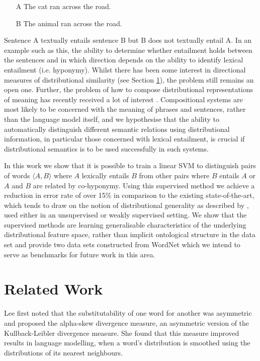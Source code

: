 \documentclass[11pt]{article}
\begin{document}
\begin{itemize}
\item[A]{The cat ran across the road.}
\item[B]{The animal ran across the road.}
\end{itemize}

Sentence A textually entails sentence B but B does not textually entail A. In an example such as this, the ability to determine whether entailment holds between the sentences and in which direction depends on the ability to identify lexical entailment (i.e. hyponymy). Whilst there has been some interest in directional measures of distributional similarity (see Section \ref{sect:relwork}), the problem still remains an open one.  Further, the problem of how to compose distributional representations of meaning has recently received a lot of interest \cite{Widdows:08,Mitchell:08,Baroni2010,Grefenstette:11,Socher:12}.  Compositional systems are most likely to be concerned with the meaning of phrases and sentences, rather than the language model itself, and we hypothesise that the ability to automatically distinguish different semantic relations using distributional information, in particular those concerned with lexical entailment, is crucial if distributional semantics is to be used successfully in such systems.

In this work we show that it is possible to train a linear SVM to distinguish pairs of words $\langle A,B\rangle$ where $A$ lexically entails $B$ from other pairs where $B$ entails $A$ or $A$ and $B$ are related by co-hyponymy.  Using this supervised method we achieve a reduction in error rate of over 15\% in comparison to the existing state-of-the-art, which tends to draw on the notion of distributional generality as described by \cite{Weeds2004}, used either in an unsupervised or weakly supervised setting.  We show that the supervised methods are learning generalisable characteristics of the underlying distributional feature space, rather than implicit ontological structure in the data set and provide two data sets constructed from WordNet which we intend to serve as benchmarks for future work in this area. 

\section{Related Work}
\label{sect:relwork}

Lee  first noted that the substitutability of one word for another was asymmetric and proposed the alpha-skew divergence measure, an asymmetric version of the Kullback-Leibler divergence measure.  She found that this measure improved results in language modelling, when a word's distribution is smoothed using the distributions of its nearest neighbours.
\end{document}
